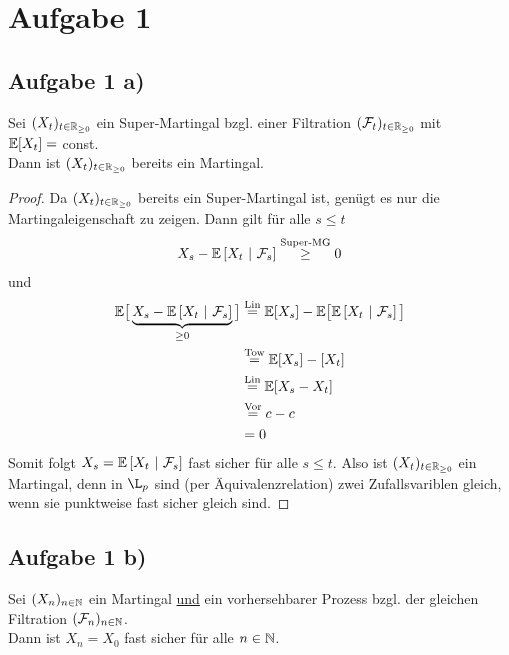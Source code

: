 \documentclass[12pt,a4paper]{article}
\author{Willi Sontopski}
\begin{document}

\section*{Aufgabe 1}
\subsection*{Aufgabe 1 a)}
Sei $(X_t)_{t\in\mathbb{R}_{\geq0}}$ ein Super-Martingal bzgl. einer Filtration $(\mathcal{F}_t)_{t\in\mathbb{R}_{\geq0}}$ mit\\ $\mathbb{E}[X_t]=$ const.\\
Dann ist $(X_t)_{t\in\mathbb{R}_{\geq0}}$ bereits ein Martingal.

\begin{proof}
Da $(X_t)_{t\in\mathbb{R}_{\geq0}}$ bereits ein Super-Martingal ist, genügt es nur die Martingaleigenschaft zu zeigen. Dann gilt für alle $s\leq t$
	\begin{align*}
		X_s - \mathbb{E}\left[{X_t}~|~{\mathcal{F}_s}\right] \stackrel{\text{Super-MG}}{\geq} 0
	\end{align*}
	und
	\begin{align*}
		\mathbb{E}\big[\underbrace{X_s - \mathbb{E}\left[{X_t}~|~{\mathcal{F}_s}\right]}_{\geq0} \big]
		&\stackrel{\text{Lin}}{=} \mathbb{E}[X_s] - \mathbb{E}\big[\mathbb{E}\left[{X_t}~|~{\mathcal{F}_s}\right] \big] \\		
		&\stackrel{\text{Tow}}{=} \mathbb{E}[X_s] - [X_t] \\
		&\stackrel{\text{Lin}}{=} \mathbb{E}[X_s-X_t]\\
		&\stackrel{\text{Vor}}{=} c-c \\
		&= 0
	\end{align*}
Somit folgt $X_s=\mathbb{E}\left[{X_t}~|~{\mathcal{F}_s}\right]$ fast sicher für alle $s\leq t$. Also ist $(X_t)_{t\in\mathbb{R}_{\geq0}}$ ein Martingal, denn in $\L_p$ sind (per Äquivalenzrelation) zwei Zufallsvariblen gleich, wenn sie punktweise fast sicher gleich sind.
\end{proof}

\subsection*{Aufgabe 1 b)}
Sei $(X_n)_{n\in\mathbb{N}}$ ein Martingal \underline{und} ein vorhersehbarer Prozess bzgl. der gleichen Filtration $(\mathcal{F}_n)_{n\in\mathbb{N}}$.\\
Dann ist $X_n=X_0$ fast sicher für alle $n\in\mathbb{N}$.
\end{document}
